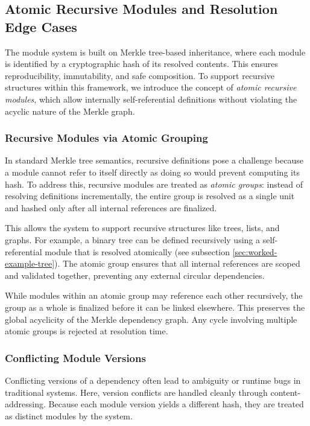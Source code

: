 \documentclass[sigplan,screen]{acmart}
\begin{document}
\subsection{Atomic Recursive Modules and Resolution Edge Cases}

The module system is built on Merkle tree-based inheritance, where each module is identified by a cryptographic hash of its resolved contents. This ensures reproducibility, immutability, and safe composition. To support recursive structures within this framework, we introduce the concept of \emph{atomic recursive modules}, which allow internally self-referential definitions without violating the acyclic nature of the Merkle graph.

\subsubsection{Recursive Modules via Atomic Grouping}
\label{sec:recursive-modules}

In standard Merkle tree semantics, recursive definitions pose a challenge because a module cannot refer to itself directly as doing so would prevent computing its hash. To address this, recursive modules are treated as \emph{atomic groups}: instead of resolving definitions incrementally, the entire group is resolved as a single unit and hashed only after all internal references are finalized.

This allows the system to support recursive structures like trees, lists, and graphs. For example, a binary tree can be defined recursively using a self-referential module that is resolved atomically (see subsection \ref{sec:worked-example-tree}). The atomic group ensures that all internal references are scoped and validated together, preventing any external circular dependencies.

While modules within an atomic group may reference each other recursively, the group as a whole is finalized before it can be linked elsewhere. This preserves the global acyclicity of the Merkle dependency graph. Any cycle involving multiple atomic groups is rejected at resolution time.

\subsubsection{Conflicting Module Versions}
\label{sec:conflicting-versions}

Conflicting versions of a dependency often lead to ambiguity or runtime bugs in traditional systems. Here, version conflicts are handled cleanly through content-addressing. Because each module version yields a different hash, they are treated as distinct modules by the system.
\end{document}
